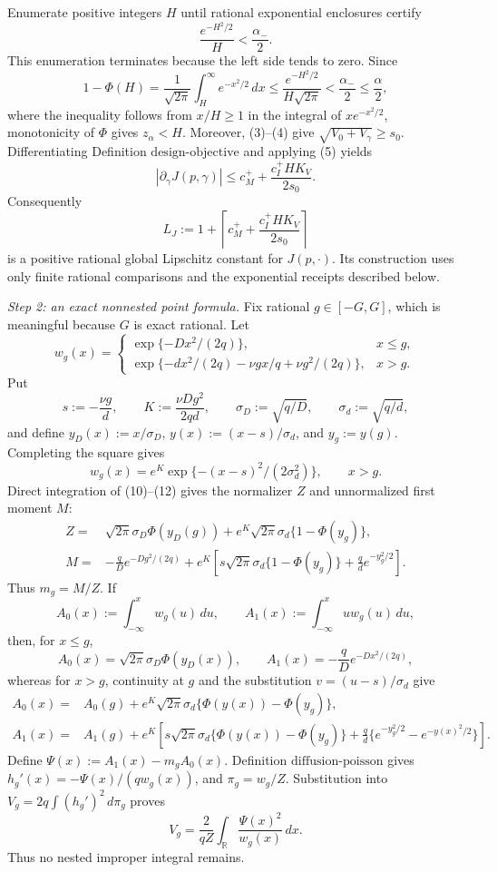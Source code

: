 Enumerate positive integers \(H\) until rational exponential enclosures certify
\[
 \frac{e^{-H^2/2}}{H}<\frac{\alpha_-}{2}.
\tag{6}
\]
This enumeration terminates because the left side tends to zero.  Since
\[
 1-\Phi(H)
 =\frac1{\sqrt{2\pi}}\int_H^\infty e^{-x^2/2}\,dx
 \leq\frac{e^{-H^2/2}}{H\sqrt{2\pi}}
 <\frac{\alpha_-}{2}\leq\frac\alpha2,
\tag{7}
\]
where the inequality follows from \(x/H\geq1\) in the integral of \(xe^{-x^2/2}\), monotonicity of \(\Phi\) gives \(z_\alpha<H\).  Moreover, (3)--(4) give \(\sqrt{V_0+V_\gamma}\geq s_0\).  Differentiating Definition \(\mathrm{design\mbox{-}objective}\) and applying (5) yields
\[
 |\partial_\gamma J(p,\gamma)|
 \leq c_M^++\frac{c_I^+HK_V}{2s_0}.
\tag{8}
\]
Consequently
\[
 L_J:=1+\left\lceil c_M^++\frac{c_I^+HK_V}{2s_0}\right\rceil
\tag{9}
\]
is a positive rational global Lipschitz constant for \(J(p,\cdot)\).  Its construction uses only finite rational comparisons and the exponential receipts described below.

\emph{Step 2: an exact nonnested point formula.}
Fix rational \(g\in[-G,G]\), which is meaningful because \(G\) is exact rational.  Let
\[
 w_g(x)=
 \begin{cases}
 \exp\{-Dx^2/(2q)\},&x\leq g,\\
 \exp\{-dx^2/(2q)-\nu gx/q+\nu g^2/(2q)\},&x>g.
 \end{cases}
\tag{10}
\]
Put
\[
 s:=-\frac{\nu g}{d},\qquad
 K:=\frac{\nu Dg^2}{2qd},\qquad
 \sigma_D:=\sqrt{q/D},\qquad \sigma_d:=\sqrt{q/d},
\tag{11}
\]
and define \(y_D(x):=x/\sigma_D\), \(y(x):=(x-s)/\sigma_d\), and \(y_g:=y(g)\).  Completing the square gives
\[
 w_g(x)=e^K\exp\{-(x-s)^2/(2\sigma_d^2)\},\qquad x>g.
\tag{12}
\]
Direct integration of (10)--(12) gives the normalizer \(Z\) and unnormalized first moment \(M\):
\[
 \begin{aligned}
 Z={}&\sqrt{2\pi}\sigma_D\Phi(y_D(g))
 +e^K\sqrt{2\pi}\sigma_d\{1-\Phi(y_g)\},\\
 M={}&-\frac qD e^{-Dg^2/(2q)}
 +e^K\left[s\sqrt{2\pi}\sigma_d\{1-\Phi(y_g)\}
 +\frac qd e^{-y_g^2/2}\right].
 \end{aligned}
\tag{13}
\]
Thus \(m_g=M/Z\).  If
\[
 A_0(x):=\int_{-\infty}^xw_g(u)\,du,
 \qquad A_1(x):=\int_{-\infty}^xuw_g(u)\,du,
\tag{14}
\]
then, for \(x\leq g\),
\[
 A_0(x)=\sqrt{2\pi}\sigma_D\Phi(y_D(x)),
 \qquad A_1(x)=-\frac qD e^{-Dx^2/(2q)},
\tag{15}
\]
whereas for \(x>g\), continuity at \(g\) and the substitution \(v=(u-s)/\sigma_d\) give
\[
 \begin{aligned}
 A_0(x)={}&A_0(g)+e^K\sqrt{2\pi}\sigma_d
 \{\Phi(y(x))-\Phi(y_g)\},\\
 A_1(x)={}&A_1(g)+e^K\left[s\sqrt{2\pi}\sigma_d
 \{\Phi(y(x))-\Phi(y_g)\}
 +\frac qd\{e^{-y_g^2/2}-e^{-y(x)^2/2}\}\right].
 \end{aligned}
\tag{16}
\]
Define \(\Psi(x):=A_1(x)-m_gA_0(x)\).  Definition \(\mathrm{diffusion\mbox{-}poisson}\) gives \(h_g'(x)=-\Psi(x)/(qw_g(x))\), and \(\pi_g=w_g/Z\).  Substitution into \(V_g=2q\int(h_g')^2\,d\pi_g\) proves
\[
 V_g=\frac2{qZ}\int_{\mathbb R}\frac{\Psi(x)^2}{w_g(x)}\,dx.
\tag{17}
\]
Thus no nested improper integral remains.

